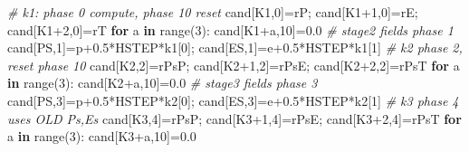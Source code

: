 \documentclass[
  a4paper,
]{article}
\newenvironment{Shaded}{}{}
\newcommand{\BuiltInTok}[1]{\textcolor[rgb]{0.00,0.50,0.00}{#1}}
\newcommand{\CommentTok}[1]{\textcolor[rgb]{0.38,0.63,0.69}{\textit{#1}}}
\newcommand{\ControlFlowTok}[1]{\textcolor[rgb]{0.00,0.44,0.13}{\textbf{#1}}}
\newcommand{\DecValTok}[1]{\textcolor[rgb]{0.25,0.63,0.44}{#1}}
\newcommand{\FloatTok}[1]{\textcolor[rgb]{0.25,0.63,0.44}{#1}}
\newcommand{\KeywordTok}[1]{\textcolor[rgb]{0.00,0.44,0.13}{\textbf{#1}}}
\newcommand{\NormalTok}[1]{#1}
\newcommand{\OperatorTok}[1]{\textcolor[rgb]{0.40,0.40,0.40}{#1}}
\begin{document}
\begin{Shaded}
\begin{Highlighting}[]
    \CommentTok{\# k1: phase 0 compute, phase 10 reset}
\NormalTok{    cand[K1,}\DecValTok{0}\NormalTok{]}\OperatorTok{=}\NormalTok{rP}\OperatorTok{;}\NormalTok{ cand[K1}\OperatorTok{+}\DecValTok{1}\NormalTok{,}\DecValTok{0}\NormalTok{]}\OperatorTok{=}\NormalTok{rE}\OperatorTok{;}\NormalTok{ cand[K1}\OperatorTok{+}\DecValTok{2}\NormalTok{,}\DecValTok{0}\NormalTok{]}\OperatorTok{=}\NormalTok{rT}
    \ControlFlowTok{for}\NormalTok{ a }\KeywordTok{in} \BuiltInTok{range}\NormalTok{(}\DecValTok{3}\NormalTok{): cand[K1}\OperatorTok{+}\NormalTok{a,}\DecValTok{10}\NormalTok{]}\OperatorTok{=}\FloatTok{0.0}
    \CommentTok{\# stage2 fields phase 1}
\NormalTok{    cand[PS,}\DecValTok{1}\NormalTok{]}\OperatorTok{=}\NormalTok{p}\OperatorTok{+}\FloatTok{0.5}\OperatorTok{*}\NormalTok{HSTEP}\OperatorTok{*}\NormalTok{k1[}\DecValTok{0}\NormalTok{]}\OperatorTok{;}\NormalTok{ cand[ES,}\DecValTok{1}\NormalTok{]}\OperatorTok{=}\NormalTok{e}\OperatorTok{+}\FloatTok{0.5}\OperatorTok{*}\NormalTok{HSTEP}\OperatorTok{*}\NormalTok{k1[}\DecValTok{1}\NormalTok{]}
    \CommentTok{\# k2 phase 2, reset phase 10}
\NormalTok{    cand[K2,}\DecValTok{2}\NormalTok{]}\OperatorTok{=}\NormalTok{rPsP}\OperatorTok{;}\NormalTok{ cand[K2}\OperatorTok{+}\DecValTok{1}\NormalTok{,}\DecValTok{2}\NormalTok{]}\OperatorTok{=}\NormalTok{rPsE}\OperatorTok{;}\NormalTok{ cand[K2}\OperatorTok{+}\DecValTok{2}\NormalTok{,}\DecValTok{2}\NormalTok{]}\OperatorTok{=}\NormalTok{rPsT}
    \ControlFlowTok{for}\NormalTok{ a }\KeywordTok{in} \BuiltInTok{range}\NormalTok{(}\DecValTok{3}\NormalTok{): cand[K2}\OperatorTok{+}\NormalTok{a,}\DecValTok{10}\NormalTok{]}\OperatorTok{=}\FloatTok{0.0}
    \CommentTok{\# stage3 fields phase 3}
\NormalTok{    cand[PS,}\DecValTok{3}\NormalTok{]}\OperatorTok{=}\NormalTok{p}\OperatorTok{+}\FloatTok{0.5}\OperatorTok{*}\NormalTok{HSTEP}\OperatorTok{*}\NormalTok{k2[}\DecValTok{0}\NormalTok{]}\OperatorTok{;}\NormalTok{ cand[ES,}\DecValTok{3}\NormalTok{]}\OperatorTok{=}\NormalTok{e}\OperatorTok{+}\FloatTok{0.5}\OperatorTok{*}\NormalTok{HSTEP}\OperatorTok{*}\NormalTok{k2[}\DecValTok{1}\NormalTok{]}
    \CommentTok{\# k3 phase 4 uses OLD Ps,Es}
\NormalTok{    cand[K3,}\DecValTok{4}\NormalTok{]}\OperatorTok{=}\NormalTok{rPsP}\OperatorTok{;}\NormalTok{ cand[K3}\OperatorTok{+}\DecValTok{1}\NormalTok{,}\DecValTok{4}\NormalTok{]}\OperatorTok{=}\NormalTok{rPsE}\OperatorTok{;}\NormalTok{ cand[K3}\OperatorTok{+}\DecValTok{2}\NormalTok{,}\DecValTok{4}\NormalTok{]}\OperatorTok{=}\NormalTok{rPsT}
    \ControlFlowTok{for}\NormalTok{ a }\KeywordTok{in} \BuiltInTok{range}\NormalTok{(}\DecValTok{3}\NormalTok{): cand[K3}\OperatorTok{+}\NormalTok{a,}\DecValTok{10}\NormalTok{]}\OperatorTok{=}\FloatTok{0.0}

\end{Highlighting}
\end{Shaded}
\end{document}
